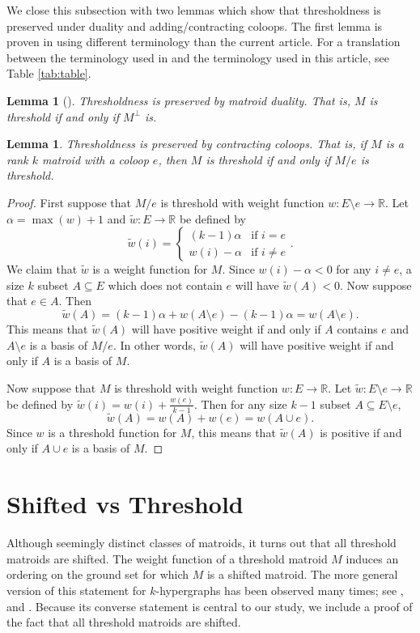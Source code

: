 \documentclass{amsart}
\theoremstyle{definition}
\theoremstyle{plain}
\newtheorem{lemma}[defn]{Lemma}
\newcommand{\R}{\mathbb{R}}
\begin{document}
We close this subsection with two lemmas which show that thresholdness is preserved under duality and adding/contracting coloops. The first lemma is proven in \cite{DO} using different terminology than the current article. For a translation between the terminology used in \cite{DO} and the terminology used in this article, see Table \ref{tab:table}.

\begin{lemma}[{\cite[Lemma $2.3$]{DO}}]
\label{lem:thresh_dual}
Thresholdness is preserved by matroid duality. That is, $M$ is threshold if and only if $M^\perp$ is.
\end{lemma}

\begin{lemma}
\label{lem:thresh_contract}
Thresholdness is preserved by contracting coloops. That is, if $M$ is a rank $k$ matroid with a coloop $e$, then $M$ is threshold if and only if $M/e$ is threshold.
\end{lemma}
\begin{proof}
First suppose that $M/e$ is threshold with weight function $w:E\setminus e \to \R$. Let $\alpha = \max(w)+1$ and $\tilde w: E \to \R$ be defined by
\[\tilde w(i) = \begin{cases}
                    (k-1)\alpha & \text{if }i=e\\
                    w(i)-\alpha & \text{if }i\neq e
\end{cases}.\]
We claim that $\tilde w$ is a weight function for $M$. Since $w(i)-\alpha< 0$ for any $i\neq e$, a size $k$ subset $A\subseteq E$ which does not contain $e$ will have $\tilde w(A)< 0$. Now suppose that $e\in A$. Then
\[\tilde w (A) = (k-1)\alpha + w(A\setminus e) - (k-1)\alpha = w(A\setminus e). \]
This means that $\tilde w(A)$ will have positive weight if and only if $A$ contains $e$ and $A\setminus e$ is a basis of $M/e$. In other words, $\tilde w(A)$ will have positive weight if and only if $A$ is a basis of $M$.

Now suppose that $M$ is threshold with weight function $w:E\to \R$. Let $\tilde w:E\setminus e\to \R$ be defined by $\tilde w(i) = w(i) + \frac{w(e)}{k-1}$. Then for any size $k-1$ subset $A\subseteq E\setminus e$,
\[\tilde w(A) = w(A) + w(e) = w(A\cup e). \]
Since $w$ is a threshold function for $M$, this means that $\tilde w(A)$ is positive if and only if $A\cup e$ is a basis of $M$.
\end{proof}

\section{Shifted vs Threshold}
\label{sec:counter}
Although seemingly distinct classes of matroids, it turns out that all threshold matroids are shifted. The weight function of a threshold matroid $M$ induces an ordering on the ground set for which $M$ is a shifted matroid. The more general version of this statement for $k$-hypergraphs has been observed many times; see \cite[Theorem $5.3.1$]{Muroga}, \cite[Lemma $2.1$]{DO} and \cite[Theorem $9.8$]{Boolean}. Because its converse statement is central to our study, we include a proof of the fact that all threshold matroids are shifted.
\end{document}
